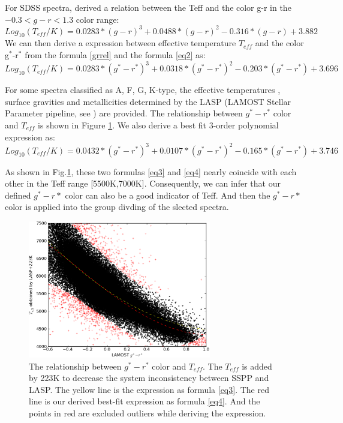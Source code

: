 \documentclass[referee]{raa}            %
\begin{document}
For SDSS spectra, \citet{ivezic2008milky} derived a relation between the Teff and the color g-r in the $-0.3 < g-r < 1.3$ color range:
\begin{equation}
 Log_{10} (T_{eff}/K)=0.0283* (g-r)^3 + 0.0488* (g-r)^2 - 0.316* (g-r) +3.882
 \label{grrel}
\end{equation}
We can then  derive a expression between effective temperature $T_{eff}$ and the color g$^*$-r$^*$ from the  formula \ref{grrel}  and the  formula \ref{eq2} as:
\begin{equation}
 Log_{10} (T_{eff}/K)=0.0283* (g^*-r^*)^3 + 0.0318* (g^*-r^*)^2 - 0.203* (g^*-r^*) +3.696
 \label{eq3}
\end{equation}

For some spectra classified as A, F, G, K-type, the effective temperatures , surface gravities  and metallicities determined by the LASP (LAMOST Stellar Parameter pipeline, see \citet{wu2011automatic}) are provided.
The relationship between $g^*-r^*$  color and $T_{eff}$ is shown in  Figure \ref{Fig3}.
We also derive a best fit 3-order  polynomial expression as:
\begin{equation}
Log_{10} (T_{eff}/K)=0.0432* (g^*-r^*)^3 +0.0107* (g^*-r^*)^2 -0.165* (g^*-r^*) +3.746
\label{eq4}
\end{equation}

As shown in Fig.\ref{Fig3}, these two formulas \ref{eq3} and \ref{eq4}  nearly  coincide with each other in the Teff range [5500K,7000K].
Consequently, we can infer that our defined $g^*-r*$ color can also be a good indicator of Teff.
And then the $g^*-r*$ color is applied into the group divding of the slected spectra.
 \begin{figure}
   \centering
   \includegraphics[width=8cm, angle=0,clip]{f3.eps}
   \caption{The relationship between $g^*-r^*$  color and $T_{eff}$.
   The $T_{eff}$ is added by 223K to decrease the system inconsistency between SSPP and LASP\citep{wu2011automatic}.
    The yellow line is the expression as formula \ref{eq3}.
     The red line is our derived best-fit expression as formula \ref{eq4}.
     And the points in red are excluded outliers while deriving the expression.   }
   \label{Fig3}
   \end{figure}
\end{document}
